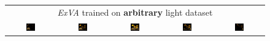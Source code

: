 \begin{figure}[!htb]
\begin{tabular*}{\textwidth}{ c c c c c }
        \multicolumn{5}{c}{\textit{ExVA} trained on \textbf{arbitrary} light dataset} \\
          \includegraphics[width=0.2\textwidth]{figures/results/arb_set/dynamic_light/exva_rand_vc0_ld-90.png}
        & \includegraphics[width=0.2\textwidth]{figures/results/arb_set/dynamic_light/exva_rand_vc0_ld-60.png}
        & \includegraphics[width=0.2\textwidth]{figures/results/arb_set/dynamic_light/exva_rand_vc0_ld0.png}
        & \includegraphics[width=0.2\textwidth]{figures/results/arb_set/dynamic_light/exva_rand_vc0_ld60.png} 
        & \includegraphics[width=0.2\textwidth]{figures/results/arb_set/dynamic_light/exva_rand_vc0_ld90.png} \\


\end{tabular*}
\end{figure}
